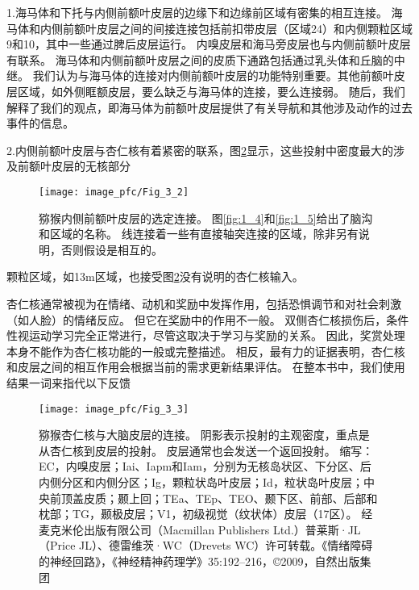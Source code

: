 1.海马体和下托与内侧前额叶皮层的边缘下和边缘前区域有密集的相互连接\cite{insausti2001cortical}。
海马体和内侧前额叶皮层之间的间接连接包括前扣带皮层（区域24）和内侧颗粒区域9和10，其中一些通过脾后皮层运行\cite{kobayashi2003macaque}。
内嗅皮层和海马旁皮层也与内侧前额叶皮层有联系\cite{kondo2003differential,munoz2005cortical}。
海马体和内侧前额叶皮层之间的皮质下通路包括通过乳头体和丘脑的中继。
我们认为与海马体的连接对内侧前额叶皮层的功能特别重要。其他前额叶皮层区域，如外侧眶额皮层，要么缺乏与海马体的连接，要么连接弱\cite{carmichael1995limbic}。
随后，我们解释了我们的观点，即海马体为前额叶皮层提供了有关导航和其他涉及动作的过去事件的信息。


2.内侧前额叶皮层与杏仁核有着紧密的联系，图\ref{fig:3_3}显示，这些投射中密度最大的涉及前额叶皮层的无核部分\par


\begin{figure}[!htb]
	\centering
	\texttt{[image: image\_pfc/Fig\_3\_2]}
	\caption{猕猴内侧前额叶皮层的选定连接。
		图\ref{fig:1_4}和\ref{fig:1_5}给出了脑沟和区域的名称。
		线连接着一些有直接轴突连接的区域，除非另有说明，否则假设是相互的。}
	\label{fig:3_2}
\end{figure}


\cite{prather2001increased,morecraft2007amygdala}颗粒区域，如13m区域，也接受图\ref{fig:3_3}没有说明的杏仁核输入。\cite{saleem2008complementary}\par
杏仁核通常被视为在情绪、动机和奖励中发挥作用，包括恐惧调节和对社会刺激（如人脸）的情绪反应。
但它在奖励中的作用不一般。
双侧杏仁核损伤后，条件性视运动学习完全正常进行，尽管这取决于学习与奖励的关系\cite{murray1996role}。
因此，奖赏处理本身不能作为杏仁核功能的一般或完整描述。
相反，最有力的证据表明，杏仁核和皮层之间的相互作用会根据当前的需求更新结果评估\cite{baxter2002amygdala}。
在整本书中，我们使用结果一词来指代以下反馈\par


\begin{figure}[!htb]
	\centering
	\texttt{[image: image\_pfc/Fig\_3\_3]}
	\caption{猕猴杏仁核与大脑皮层的连接。
		阴影表示投射的主观密度，重点是从杏仁核到皮层的投射。
		皮层通常也会发送一个返回投射。
		缩写：EC，内嗅皮层；Iai、Iapm和Iam，分别为无核岛状区、下分区、后内侧分区和内侧分区；Ig，颗粒状岛叶皮层；Id，粒状岛叶皮层；中央前顶盖皮质；颞上回；TEa、TEp、TEO、颞下区、前部、后部和枕部；TG，颞极皮层；V1，初级视觉（纹状体）皮层（17区）。
		经麦克米伦出版有限公司（Macmillan Publishers Ltd.）普莱斯·JL（Price JL）、德雷维茨·WC（Drevets WC）许可转载。《情绪障碍的神经回路》，《神经精神药理学》35:192–216，©2009，自然出版集团}
	\label{fig:3_3}
\end{figure}


